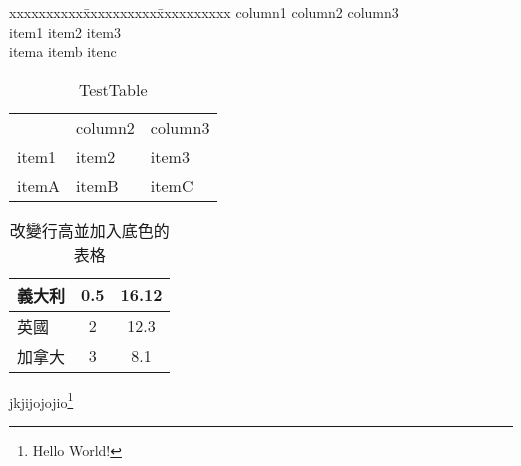 	\begin{frame}
		\begin{tabbing}
	
			xxxxxxxxxx\=xxxxxxxxxx\=xxxxxxxxxx\kill
			column1	\> column2	\> column3	\\
			item1	\> item2	\> item3	\\
			itema	\> itemb	\> itenc

		\end{tabbing}

		\begin{table}[h]
			\caption{TestTable}
			\centering
			\begin{tabular}[t]{lll} %
				\hline
					& column2 & column3	\\
				\cline{2-3}
				item1	& item2	& item3	\\
				itemA	& itemB	& itemC	\\
				\hline
			\end{tabular}
		\end{table}


		\begin{table}[h]
    		\centering
			\begin{tabular}{lcc}
			\hline
			義大利 & 0.5  & 16.12 \\\hline
			英國   & 2    & 12.3 \\\hline
			加拿大 & 3    & 8.1 \\\hline
			\end{tabular}
    		\caption{改變行高並加入底色的表格}\label{basic_2}  %
		\end{table}
	
	\end{frame}
	
	\begin{frame}
		jkjijojojio\footnote{Hello World!}
	\end{frame}